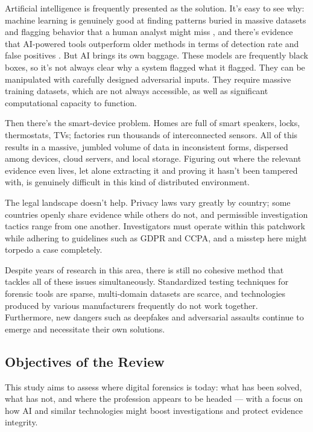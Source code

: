 \documentclass[12pt,a4paper]{article}
\begin{document}
\begin{justify}
Artificial intelligence is frequently presented as the solution. It's easy to see why: machine learning is genuinely good at finding patterns buried in massive datasets and flagging behavior that a human analyst might miss , and there's evidence that AI-powered tools outperform older methods in terms of detection rate and false positives . But AI brings its own baggage. These models are frequently black boxes, so it's not always clear why a system flagged what it flagged. They can be manipulated with carefully designed adversarial inputs. They require massive training datasets, which are not always accessible, as well as significant computational capacity to function.


Then there's the smart-device problem. Homes are full of smart speakers, locks, thermostats, TVs; factories run thousands of interconnected sensors. All of this results in a massive, jumbled volume of data in inconsistent forms, dispersed among devices, cloud servers, and local storage. Figuring out where the relevant evidence even lives, let alone extracting it and proving it hasn't been tampered with, is genuinely difficult in this kind of distributed environment.


The legal landscape doesn't help. Privacy laws vary greatly by country; some countries openly share evidence while others do not, and permissible investigation tactics range from one another. Investigators must operate within this patchwork while adhering to guidelines such as GDPR and CCPA, and a misstep here might torpedo a case completely.


Despite years of research in this area, there is still no cohesive method that tackles all of these issues simultaneously. Standardized testing techniques for forensic tools are sparse, multi-domain datasets are scarce, and technologies produced by various manufacturers frequently do not work together. Furthermore, new dangers such as deepfakes and adversarial assaults continue to emerge and necessitate their own solutions.

\subsection{Objectives of the Review}


This study aims to assess where digital forensics is today: what has been solved, what has not, and where the profession appears to be headed — with a focus on how AI and similar technologies might boost investigations and protect evidence integrity.



\end{justify}
\end{document}
